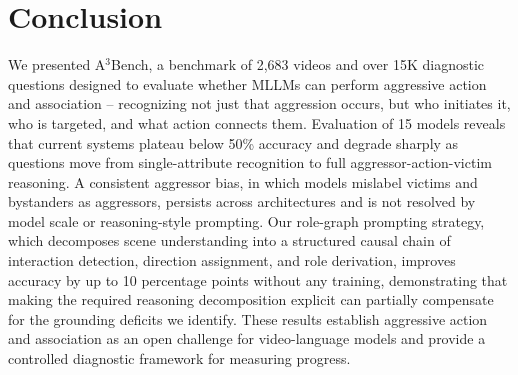 \section{Conclusion}
We presented A$^3$Bench, a benchmark of 2,683 videos and over 15K diagnostic questions designed to evaluate whether MLLMs can perform aggressive action and association -- recognizing not just that aggression occurs, but who initiates it, who is targeted, and what action connects them. Evaluation of 15 models reveals that current systems plateau below 50\% accuracy and degrade sharply as questions move from single-attribute recognition to full aggressor-action-victim reasoning. A consistent aggressor bias, in which models mislabel victims and bystanders as aggressors, persists across architectures and is not resolved by model scale or reasoning-style prompting. Our role-graph prompting strategy, which decomposes scene understanding into a structured causal chain of interaction detection, direction assignment, and role derivation, improves accuracy by up to 10 percentage points without any training, demonstrating that making the required reasoning decomposition explicit can partially compensate for the grounding deficits we identify. These results establish aggressive action and association as an open challenge for video-language models and provide a controlled diagnostic framework for measuring progress.
